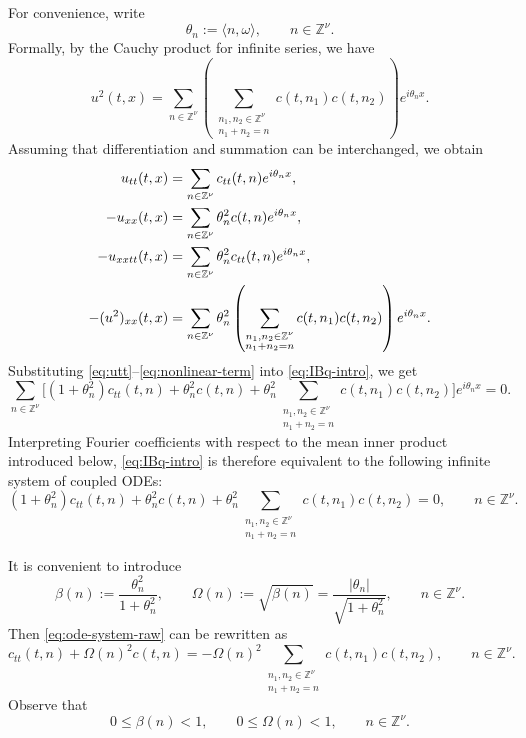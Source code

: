 \documentclass[12pt,reqno,tbtags]{amsart}
\newcommand\1{\mathbbm{1}}
\begin{document}
For convenience, write
\[
\theta_n:=\langle n,\omega\rangle, \qquad n\in\mathbb{Z}^{\nu}.
\]
Formally, by the Cauchy product for infinite series, we have
\begin{equation*}
u^2(t,x)
=
\sum_{n\in\mathbb{Z}^{\nu}}
\left(
\sum_{\substack{n_1,n_2\in\mathbb{Z}^{\nu}\\ n_1+n_2=n}}
c(t,n_1)c(t,n_2)
\right)e^{i\theta_n x}.
\end{equation*}
Assuming that differentiation and summation can be interchanged, we obtain
\begin{align}
u_{tt}(t,x)
&=
\sum_{n\in\mathbb{Z}^{\nu}} c_{tt}(t,n)e^{i\theta_n x}, \label{eq:utt}\\
-u_{xx}(t,x)
&=
\sum_{n\in\mathbb{Z}^{\nu}} \theta_n^2 c(t,n)e^{i\theta_n x}, \notag\\
-u_{xxtt}(t,x)
&=
\sum_{n\in\mathbb{Z}^{\nu}} \theta_n^2 c_{tt}(t,n)e^{i\theta_n x}, \notag\\
-(u^2)_{xx}(t,x)
&=
\sum_{n\in\mathbb{Z}^{\nu}}
\theta_n^2
\left(
\sum_{\substack{n_1,n_2\in\mathbb{Z}^{\nu}\\ n_1+n_2=n}}
c(t,n_1)c(t,n_2)
\right)e^{i\theta_n x}. \label{eq:nonlinear-term}
\end{align}
Substituting \eqref{eq:utt}--\eqref{eq:nonlinear-term} into \eqref{eq:IBq-intro}, we get
\[
\sum_{n\in\mathbb{Z}^{\nu}}
\Bigg[
(1+\theta_n^2)c_{tt}(t,n)
+\theta_n^2 c(t,n)
+\theta_n^2
\sum_{\substack{n_1,n_2\in\mathbb{Z}^{\nu}\\ n_1+n_2=n}}
c(t,n_1)c(t,n_2)
\Bigg]e^{i\theta_n x}
=0.
\]
Interpreting Fourier coefficients with respect to the mean inner product introduced below, \eqref{eq:IBq-intro} is therefore equivalent to the following infinite system of coupled ODEs:
\begin{equation}\label{eq:ode-system-raw}
(1+\theta_n^2)c_{tt}(t,n)
+\theta_n^2 c(t,n)
+\theta_n^2
\sum_{\substack{n_1,n_2\in\mathbb{Z}^{\nu}\\ n_1+n_2=n}}
c(t,n_1)c(t,n_2)
=0,
\qquad n\in\mathbb{Z}^{\nu}.
\end{equation}

It is convenient to introduce
\begin{equation*}
\beta(n):=\frac{\theta_n^2}{1+\theta_n^2},
\qquad
\Omega(n):=\sqrt{\beta(n)}=\frac{|\theta_n|}{\sqrt{1+\theta_n^2}},
\qquad n\in\mathbb{Z}^{\nu}.
\end{equation*}
Then \eqref{eq:ode-system-raw} can be rewritten as
\begin{equation}\label{eq:ode-system}
c_{tt}(t,n)+\Omega(n)^2 c(t,n)
=
-\Omega(n)^2
\sum_{\substack{n_1,n_2\in\mathbb{Z}^{\nu}\\ n_1+n_2=n}}
c(t,n_1)c(t,n_2),
\qquad n\in\mathbb{Z}^{\nu}.
\end{equation}
Observe that
\[
0\leq \beta(n)<1,
\qquad
0\leq \Omega(n)<1,
\qquad n\in\mathbb{Z}^{\nu}.
\]
\end{document}

